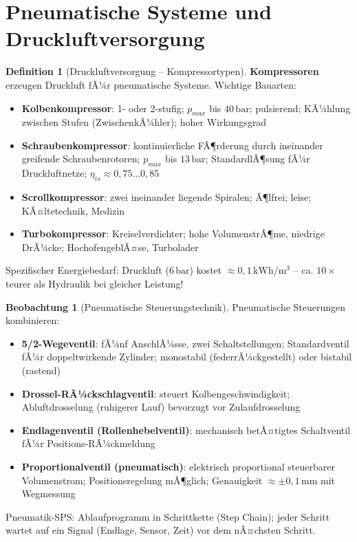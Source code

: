 ﻿\documentclass[a4paper,12pt]{report}
\theoremstyle{definition}
\newtheorem{definition}{Definition}
\newtheorem{beobachtung}{Beobachtung}
\begin{document}
\section{Pneumatische Systeme und Druckluftversorgung}

\begin{definition}[Druckluftversorgung -- Kompressortypen]
\textbf{Kompressoren} erzeugen Druckluft fÃ¼r pneumatische Systeme.
Wichtige Bauarten:
\begin{itemize}
    \item[-] \textbf{Kolbenkompressor}: 1- oder 2-stufig; $p_{max}$ bis $40\,\mathrm{bar}$;
          pulsierend; KÃ¼hlung zwischen Stufen (ZwischenkÃ¼hler); hoher Wirkungsgrad
    \item[-] \textbf{Schraubenkompressor}: kontinuierliche FÃ¶rderung durch
          ineinander greifende Schraubenrotoren; $p_{max}$ bis $13\,\mathrm{bar}$;
          StandardlÃ¶sung fÃ¼r Druckluftnetze; $\eta_{is} \approx 0{,}75\ldots0{,}85$
    \item[-] \textbf{Scrollkompressor}: zwei ineinander liegende Spiralen;
          Ã¶lfrei; leise; KÃ¤ltetechnik, Medizin
    \item[-] \textbf{Turbokompressor}: Kreiselverdichter; hohe VolumenstrÃ¶me,
          niedrige DrÃ¼cke; HochofengeblÃ¤se, Turbolader
\end{itemize}
Spezifischer Energiebedarf: Druckluft ($6\,\mathrm{bar}$) kostet
$\approx 0{,}1\,\mathrm{kWh/m^3}$ -- ca. $10\times$ teurer als Hydraulik
bei gleicher Leistung!
\end{definition}

\begin{beobachtung}[Pneumatische Steuerungstechnik]
Pneumatische Steuerungen kombinieren:
\begin{itemize}
    \item[-] \textbf{5/2-Wegeventil}: fÃ¼nf AnschlÃ¼sse, zwei Schaltstellungen;
          Standardventil fÃ¼r doppeltwirkende Zylinder; monostabil (federrÃ¼ckgestellt)
          oder bistabil (rastend)
    \item[-] \textbf{Drossel-RÃ¼ckschlagventil}: steuert Kolbengeschwindigkeit;
          Abluftdrosselung (ruhigerer Lauf) bevorzugt vor Zulaufdrosselung
    \item[-] \textbf{Endlagenventil (Rollenhebelventil)}: mechanisch betÃ¤tigtes
          Schaltventil fÃ¼r Positions-RÃ¼ckmeldung
    \item[-] \textbf{Proportionalventil (pneumatisch)}: elektrisch proportional
          steuerbarer Volumenstrom; Positionsregelung mÃ¶glich;
          Genauigkeit $\approx \pm 0{,}1\,\mathrm{mm}$ mit Wegmessung
\end{itemize}
Pneumatik-SPS: Ablaufprogramm in Schrittkette (Step Chain); jeder Schritt
wartet auf ein Signal (Endlage, Sensor, Zeit) vor dem nÃ¤chsten Schritt.
\end{beobachtung}
\end{document}
